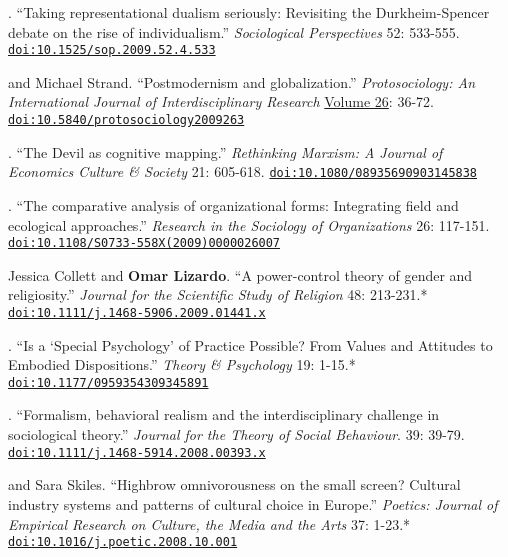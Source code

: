 
. ``Taking representational dualism seriously: Revisiting the Durkheim-Spencer debate on the rise of individualism.''  {\em Sociological Perspectives} 52: 533-555. \href{https://doi.org/10.1525/sop.2009.52.4.533}{\nolinkurl{doi:10.1525/sop.2009.52.4.533}}

 and Michael Strand. ``Postmodernism and globalization.'' {\em Protosociology: An International Journal of Interdisciplinary Research} \href{http://www.protosociology.de/Download/ProtoSociology-Vol26-S.pdf}{Volume 26}: 36-72. \href{https://doi.org/10.5840/protosociology2009263}{\nolinkurl{doi:10.5840/protosociology2009263}}

. ``The Devil as cognitive mapping.''  {\em Rethinking Marxism: A Journal of Economics Culture \& Society } 21: 605-618. \href{https://doi.org/10.1080/08935690903145838}{\nolinkurl{doi:10.1080/08935690903145838}}

. ``The comparative analysis of organizational forms:  Integrating field and ecological approaches.''  {\em Research in the Sociology of Organizations} 26: 117-151. \href{https://doi.org/10.1108/S0733-558X(2009)0000026007}{\nolinkurl{doi:10.1108/S0733-558X(2009)0000026007}}

\ind Jessica Collett and {\bf Omar Lizardo}. ``A power-control theory of gender and religiosity.'' {\em Journal for the Scientific Study of Religion} 48: 213-231.\textcolor{uclagold}{*} \href{https://doi.org/10.1111/j.1468-5906.2009.01441.x
}{\nolinkurl{doi:10.1111/j.1468-5906.2009.01441.x
}}

. ``Is a `Special Psychology' of Practice Possible? From Values and Attitudes to Embodied Dispositions.'' \emph{Theory \& Psychology} 19: 1-15.\textcolor{uclablue}{*} \href{https://doi.org/10.1177/0959354309345891}{\nolinkurl{doi:10.1177/0959354309345891}}

. ``Formalism, behavioral realism and the interdisciplinary challenge in sociological theory.'' {\em Journal for the Theory of Social Behaviour}.  39: 39-79. \href{https://doi.org/10.1111/j.1468-5914.2008.00393.x}{\nolinkurl{doi:10.1111/j.1468-5914.2008.00393.x}}

 and Sara Skiles. ``Highbrow omnivorousness on the small screen? Cultural industry systems and patterns of cultural choice in Europe.'' {\em Poetics: Journal of Empirical Research on Culture, the Media and the Arts} 37: 1-23.\textcolor{uclablue}{*} \href{https://doi.org/10.1016/j.poetic.2008.10.001}{\nolinkurl{doi:10.1016/j.poetic.2008.10.001}}